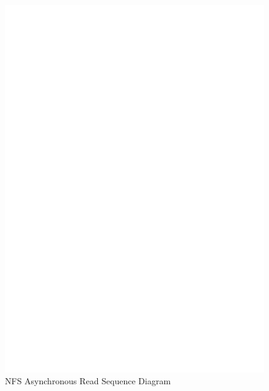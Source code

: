 \begin{figure}
\centering
\includegraphics[scale=0.75]{figures/AsyncSequence.eps}
\caption{NFS Asynchronous Read Sequence Diagram}
\label{fig:NFSAsyncRead}
\end{figure}


